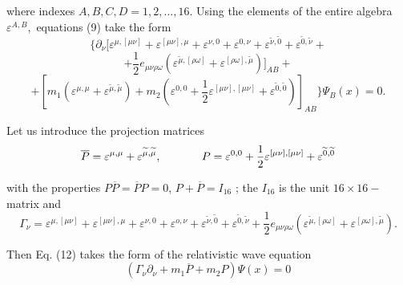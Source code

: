 \documentclass[a4paper,12pt]{article}
\begin{document}
where indexes $A,B,C,D=1,2,...,16$. Using the elements of the entire algebra
$\varepsilon ^{A,B},$ equations (9) take the form
\[
\biggl \{\partial _\nu \biggl [\varepsilon ^{\mu ,[\mu \nu
]}+\varepsilon ^{[\mu \nu ],\mu }+\varepsilon ^{\nu
,0}+\varepsilon ^{0,\nu }+\varepsilon ^{ \widetilde{\nu
},\widetilde{0}}+\varepsilon ^{\widetilde{0},\widetilde{\nu } }+
\]
\begin{equation}
+\frac 12e_{\mu \nu \rho \omega }\left( \varepsilon
^{\widetilde{\mu },[\rho \omega ]}+\varepsilon ^{[\rho \omega
],\widetilde{\mu }}\right) \biggr ] _{AB}+  \label{12}
\end{equation}
\[
+\left[ m_1\left( \varepsilon ^{\mu ,\mu }+\varepsilon
^{\widetilde{\mu }, \widetilde{\mu }}\right) +m_2\left(
\varepsilon ^{0,0}+\frac 12\varepsilon ^{[\mu \nu ],[\mu \nu
]}+\varepsilon ^{\widetilde{0},\widetilde{0}}\right) \right]
_{AB}\biggr \}\Psi _B(x)=0 .
\]

Let us introduce the projection matrices
\begin{equation}
\overline{P}=\varepsilon ^{\mu ,\mu }+\varepsilon ^{\widetilde{\mu
}, \widetilde{\mu }} ,\hspace{0.5in}P=\varepsilon ^{0,0}+\frac
12\varepsilon ^{[\mu \nu ],[\mu \nu ]}+\varepsilon
^{\widetilde{0},\widetilde{0}} \label{13}
\end{equation}

with the properties $P\overline{P}=\overline{P}P=0$,
$P+\overline{P}=I_{16}$ ; the $I_{16}$ is the unit $16\times
16-$matrix and
\begin{equation}
\Gamma _\nu =\varepsilon ^{\mu ,[\mu \nu ]}+\varepsilon ^{[\mu \nu
],\mu }+\varepsilon ^{\nu ,0}+\varepsilon ^{o,\nu }+\varepsilon
^{\widetilde{\nu }, \widetilde{0}}+\varepsilon
^{\widetilde{0},\widetilde{\nu }}+\frac 12e_{\mu \nu \rho \omega
}\left( \varepsilon ^{\widetilde{\mu },[\rho \omega ]}+\varepsilon
^{[\rho \omega ],\widetilde{\mu }}\right) . \label{14}
\end{equation}

Then Eq. (12) takes the form of the relativistic wave equation
\begin{equation}
\left( \Gamma _\nu \partial _\nu +m_1\overline{P}+m_2P\right) \Psi (x)=0
\label{15}
\end{equation}
\end{document}
